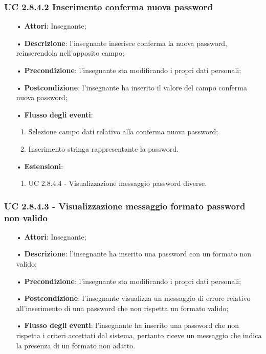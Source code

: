 \subsubsection{UC 2.8.4.2 Inserimento conferma nuova password}
\begin{itemize}
	\item[•]\textbf{Attori}: Insegnante;
	\item[•]\textbf{Descrizione}: l'insegnante inserisce conferma la nuova password, reinserendola nell'apposito campo;
	\item[•]\textbf{Precondizione}: l'insegnante sta modificando i propri dati personali;
	\item[•]\textbf{Postcondizione}: l'insegnante ha inserito il valore del campo conferma nuova password; 
	\item[•]\textbf{Flusso degli eventi}: 
	\begin{enumerate}
		\item Selezione campo dati relativo alla conferma nuova password;
		\item Inserimento stringa rappresentante la password.
	\end{enumerate}
	\item[•]\textbf{Estensioni}:
	\begin{enumerate}
		\item UC 2.8.4.4 - Visualizzazione messaggio password diverse.
	\end{enumerate}
\end{itemize}


\subsubsection{UC 2.8.4.3 - Visualizzazione messaggio formato password non valido}
\begin{itemize}
	\item[•]\textbf{Attori}: Insegnante;
	\item[•]\textbf{Descrizione}: l'insegnante ha inserito una password con un formato non valido;
	\item[•]\textbf{Precondizione}: l'insegnante sta modificando i propri dati personali;
	\item[•]\textbf{Postcondizione}: l'insegnante visualizza un messaggio di errore relativo all'inserimento di una password che non rispetta un formato valido; 
	\item[•]\textbf{Flusso degli eventi}: l'insegnante ha inserito una password che non rispetta i criteri accettati dal sistema, pertanto riceve un messaggio che indica la presenza di un formato non adatto.
\end{itemize}

